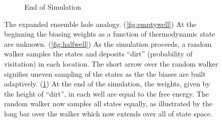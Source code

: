 \documentclass[9pt,review]{livecoms}
\newcommand{\vx}{\mathbf{x}}
\providecommand{\DIFdelbegin}{} %
\newcommand{\DIFscaledelfig}{0.5}
\newlength{\DIFdelgraphicswidth} %
\newlength{\DIFdelgraphicsheight} %
\newcommand{\DIFdelincludegraphics}[2][]{%
\sbox{\DIFdelgraphicsbox}{\DIFOincludegraphics[#1]{#2}}%
\settoboxwidth{\DIFdelgraphicswidth}{\DIFdelgraphicsbox} %
\settoboxtotalheight{\DIFdelgraphicsheight}{\DIFdelgraphicsbox} %
\scalebox{\DIFscaledelfig}{%
\parbox[b]{\DIFdelgraphicswidth}{\usebox{\DIFdelgraphicsbox}\\[-\baselineskip] \rule{\DIFdelgraphicswidth}{0em}}\llap{\resizebox{\DIFdelgraphicswidth}{\DIFdelgraphicsheight}{%
\setlength{\unitlength}{\DIFdelgraphicswidth}%
\begin{picture}(1,1)%
\thicklines\linethickness{2pt} %
{\color[rgb]{1,0,0}\put(0,0){\framebox(1,1){}}}%
{\color[rgb]{1,0,0}\put(0,0){\line( 1,1){1}}}%
{\color[rgb]{1,0,0}\put(0,1){\line(1,-1){1}}}%
\end{picture}%
}\hspace*{3pt}}} %
} %
\DeclareRobustCommand{\DIFdelbegin}{\DIFOdelbegin \let\includegraphics\DIFdelincludegraphics} %
\begin{document}
\begin{figure}[ht]
\begin{subfigure}[b]{0.33\textwidth}
\caption{End of Simulation}
\label{fig:fullwell}
\end{subfigure}
\caption{The expanded ensemble hole analogy. (\ref{fig:emptywell}) At the beginning the biasing weights as a function of thermodynamic state are unknown. (\ref{fig:halfwell}) As the simulation proceeds, a random walker samples the states and deposits ``dirt'' (probability of visitation) in each location.  The short arrow over the random walker signifies uneven sampling of the states as the the biases are built adaptively.  (\ref{fig:fullwell}) At the end of the simulation, the weights, given by the height of ``dirt'', in each well are equal to the free energy.  The random walker now samples all states equally, as illustrated by the long bar over the walker which now extends over all of state space.} \label{fig:EXEanalogy}
\end{figure}


\DIFdelbegin %
\end{document}
